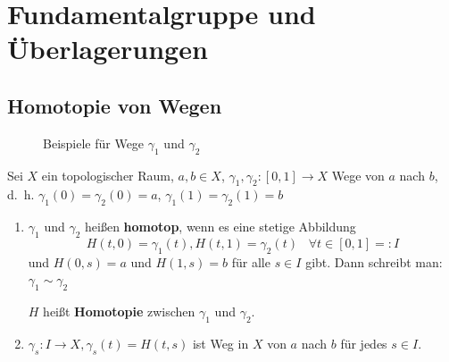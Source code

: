 \chapter{Fundamentalgruppe und Überlagerungen}
\section{Homotopie von Wegen}
\begin{figure}[ht]
    \centering
    \hspace{1em}%
    \label{fig:paths-homotop-example-counterexample}
    \caption{Beispiele für Wege $\gamma_1$ und $\gamma_2$}
\end{figure}

\begin{definition}
    Sei $X$ ein topologischer Raum, $a, b \in X$, 
    $\gamma_1, \gamma_2: [0,1] \rightarrow X$ Wege von $a$ nach $b$,
    d.~h. $\gamma_1(0) = \gamma_2(0) = a$, $\gamma_1(1) = \gamma_2(1) = b$

    \begin{enumerate}[label=\alph*)]
        \item $\gamma_1$ und $\gamma_2$ heißen \textbf{homotop},
              wenn es eine stetige Abbildung
              \[H(t,0) = \gamma_1(t), H(t,1) = \gamma_2(t) \;\;\; \forall t \in [0,1] =: I \]
              und $H(0,s) = a$ und $H(1,s) = b$ für alle $s \in I$ gibt.
              Dann schreibt man: $\gamma_1 \sim \gamma_2$

              $H$ heißt \textbf{Homotopie} zwischen
              $\gamma_1$ und $\gamma_2$.
        \item $\gamma_s: I \rightarrow X, \gamma_s(t) = H(t,s)$ ist
              Weg in $X$ von $a$ nach $b$ für jedes $s \in I$.
    \end{enumerate}
\end{definition}

